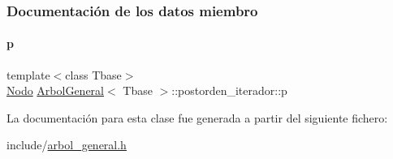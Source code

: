 \subsubsection{Documentación de los datos miembro}
\hypertarget{classArbolGeneral_1_1postorden__iterador_ae269432023776674c7633eadeb8c30e0}{}\label{classArbolGeneral_1_1postorden__iterador_ae269432023776674c7633eadeb8c30e0} 
\paragraph{\texorpdfstring{p}{p}}
{\footnotesize\ttfamily template$<$class Tbase$>$ \\
\hyperlink{classArbolGeneral_a12cc1b74a9095d89bc7334290d332f7a}{Nodo} \hyperlink{classArbolGeneral}{Arbol\+General}$<$ Tbase $>$\+::postorden\+\_\+iterador\+::p\hspace{0.3cm}{\ttfamily [private]}}



La documentación para esta clase fue generada a partir del siguiente fichero\+:\begin{DoxyCompactItemize}
\item 
include/\hyperlink{arbol__general_8h}{arbol\+\_\+general.\+h}\end{DoxyCompactItemize}
